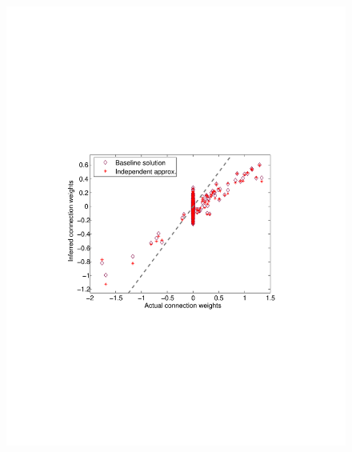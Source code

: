 \begin{figure}
\centering
\begin{minipage}[c]{0.45\hsize}
\includegraphics[width=\hsize]{../figs/Figure2_fluor_base_vs_iid}
\end{minipage}
\begin{minipage}[c]{0.45\hsize}

\end{minipage}
\end{figure}
